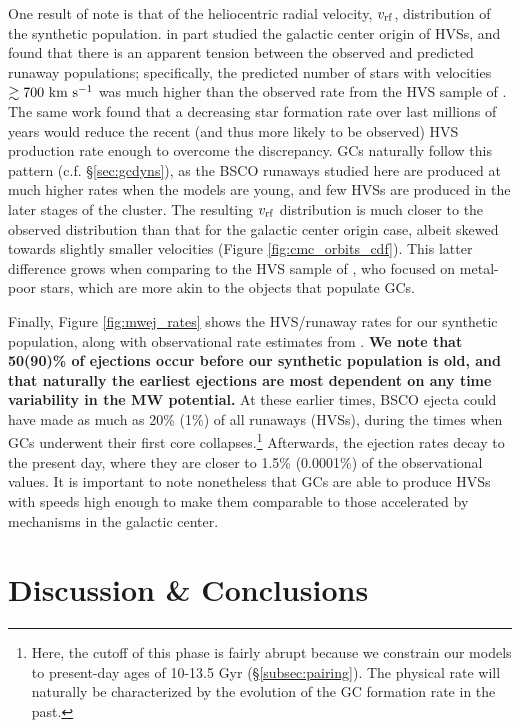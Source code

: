 \documentclass[twocolumn]{aastex631}
\begin{document}
One result of note is that of the heliocentric radial velocity, $v_{\rm rf}$, distribution of the synthetic population.
\citet{2021arXiv211213864G} in part studied the galactic center origin of HVSs, and found that there is an apparent tension between the observed and predicted runaway populations; specifically, the predicted number of stars with velocities $\gtrsim 700~{\rm km~s^{-1}}$ was much higher than the observed rate from the HVS sample of \citet{2018ApJ...866...39B}.
The same work found that a decreasing star formation rate over last millions of years would reduce the recent (and thus more likely to be observed) HVS production rate enough to overcome the discrepancy.
GCs naturally follow this pattern (c.f. \S\ref{sec:gcdyns}), as the BSCO runaways studied here are produced at much higher rates when the models are young, and few HVSs are produced in the later stages of the cluster.
The resulting $v_{\rm rf}$ distribution is much closer to the observed distribution than that for the galactic center origin case, albeit skewed towards slightly smaller velocities (Figure \ref{fig:cmc_orbits_cdf}).
This latter difference grows when comparing to the HVS sample of \citet{2018ApJ...866..121H}, who focused on metal-poor stars, which are more akin to the objects that populate GCs.

Finally, Figure \ref{fig:mwej_rates} shows the HVS/runaway rates for our synthetic population, along with observational rate estimates from \citet{2015ARA&A..53...15B}.
\textbf{We note that 50(90)\% of ejections occur before our synthetic population is old, and that naturally the earliest ejections are most dependent on any time variability in the MW potential.}
At these earlier times, BSCO ejecta could have made as much as 20\% (1\%) of all runaways (HVSs), during the times when GCs underwent their first core collapses.\footnote{Here, the cutoff of this phase is fairly abrupt because we constrain our models to present-day ages of 10-13.5 Gyr (\S\ref{subsec:pairing}).  The physical rate will naturally be characterized by the evolution of the GC formation rate in the past.}
Afterwards, the ejection rates decay to the present day, where they are closer to 1.5\% (0.0001\%) of the observational values.
It is important to note nonetheless that GCs are able to produce HVSs with speeds high enough to make them comparable to those accelerated by mechanisms in the galactic center.

\section{Discussion \& Conclusions} \label{sec:disccon}
\end{document}
